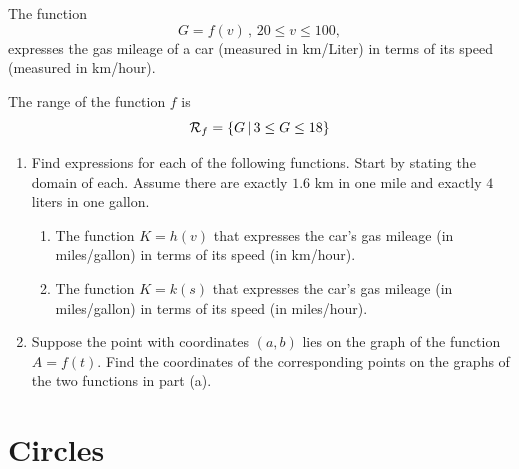 \documentclass{ximera}
\begin{document}
\begin{question} \label{Qpd0f3fe}
The function
\[
    G = f(v) \, , \, 20\leq v \leq 100,
\]
expresses the gas mileage of a car (measured in km/Liter) in terms of its speed (measured in km/hour). 

The range of the function $f$ is
\[
  {\cal R}_f = \{ G \, | \, 3 \leq G \leq  18 \}
\]



\begin{enumerate}
\item Find expressions for each of the following functions. Start by stating the domain of each. Assume there are exactly $1.6$ km in one mile and exactly $4$ liters in one gallon. 

\begin{enumerate}
\item The function $K = h(v)$ that expresses the car's gas mileage (in miles/gallon) in terms of its speed (in km/hour).

\item The function $K=k(s)$ that expresses the car's gas mileage (in miles/gallon) in terms of its speed (in miles/hour).
\end{enumerate}

\item Suppose the point with coordinates $(a,b)$ lies on the graph of the function $A=f(t)$. Find the coordinates of the corresponding points on the graphs of the two functions in part (a).


\end{enumerate}
\end{question}


\section{Circles}
\end{document}
